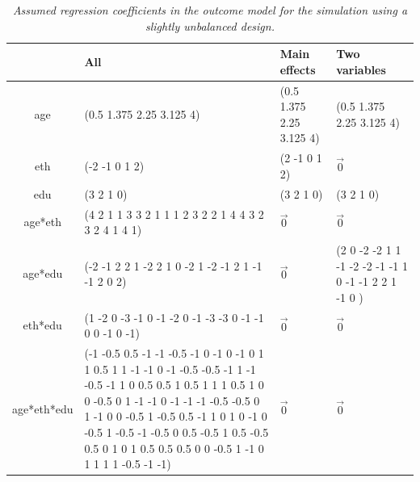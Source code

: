 \documentclass[11pt]{article}
\begin{document}
\begin{table}
\begin{center}
\footnotesize
\begin{tabular}{c|p{4cm}|l|p{4cm}}
&All & Main effects & Two variables\\
\hline
age&(0.5 1.375 2.25 3.125 4)&(0.5 1.375 2.25 3.125 4)&(0.5 1.375 2.25 3.125 4)\\
eth&(-2 -1 0 1 2)&(2 -1 0 1 2)& $\vec{0}$\\
edu&(3 2 1 0)&(3 2 1 0)&(3 2 1 0)\\
age*eth&(4 2 1 1 3 3 2 1 1 1 2 3 2 2 1 4 4 3 2 3 2 4 1 4 1)& $\vec{0}$& $\vec{0}$\\
age*edu&(-2 -1 2 2 1 -2 2 1 0 -2 1 -2 -1 2 1 -1 -1 2 0 2)& $\vec{0}$&(2 0 -2 -2 1 1 -1 -2 -2 -1 -1 1 0 -1 -1 2 2 1 -1 0 )\\
eth*edu&(1 -2 0 -3 -1 0 -1 -2 0 -1 -3 -3 0 -1 -1 0 0 -1 0 -1)& $\vec{0}$& $\vec{0}$\\
age*eth*edu&(-1 -0.5 0.5 -1 -1 -0.5 -1 0 -1 0 -1 0 1 1 0.5 1 1 -1 -1 0 -1 -0.5 -0.5 -1 1 -1 -0.5 -1 1 0 0.5 0.5 1 0.5 1 1 1 0.5 1 0 0 -0.5 0 1 -1 -1 0 -1 -1 -1 -0.5 -0.5 0 1 -1 0 0 -0.5 1 -0.5 0.5 -1 1 0 1 0 -1 0 -0.5 1 -0.5 -1 -0.5 0 0.5 -0.5 1 0.5 -0.5 0.5 0 1 0 1 0.5 0.5 0.5 0 0 -0.5 1 -1 0 1 1 1 1 -0.5 -1 -1)& $\vec{0}$& $\vec{0}$
\end{tabular}
\end{center}
\caption{\em Assumed regression coefficients in the {\em outcome} model for the simulation using a slightly unbalanced design.}
\label{s1-response-coef}
\end{table}
\end{document}
